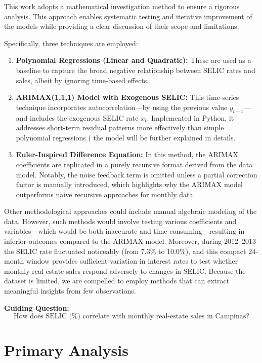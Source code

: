 \documentclass{article}
\begin{document}
This work adopts a mathematical investigation method to ensure a rigorous analysis. This approach enables systematic testing and iterative improvement of the models while providing a clear discussion of their scope and limitations.

Specifically, three techniques are employed:
\begin{enumerate}
    \item \textbf{Polynomial Regressions (Linear and Quadratic):} These are used as a baseline to capture the broad negative relationship between SELIC rates and sales, albeit by ignoring time-based effects.
    \item \textbf{ARIMAX(1,1,1) Model with Exogenous SELIC:} This time-series technique incorporates autocorrelation—by using the previous value \(y_{t-1}\)—and includes the exogenous SELIC rate \(x_t\). Implemented in Python, it addresses short-term residual patterns more effectively than simple polynomial regressions ( the model will be further explained in details.
    \item \textbf{Euler-Inspired Difference Equation:} In this method, the ARIMAX coefficients are replicated in a purely recursive format derived from the data model. Notably, the noise feedback term is omitted unless a partial correction factor is manually introduced, which highlights why the ARIMAX model outperforms naive recursive approaches for monthly data.
\end{enumerate}

Other methodological approaches could include manual algebraic modeling of the data. However, such methods would involve testing various coefficients and variables—which would be both inaccurate and time-consuming—resulting in inferior outcomes compared to the ARIMAX model. Moreover, during 2012–2013 the SELIC rate fluctuated noticeably (from 7.3\% to 10.0\%), and this compact 24-month window provides sufficient variation in interest rates to test whether monthly real-estate sales respond adversely to changes in SELIC. Because the dataset is limited, we are compelled to employ methods that can extract meaningful insights from few observations.

\textbf{Guiding Question:}
\[
\text{How does SELIC (\%) correlate with monthly real-estate sales in Campinas?}
\]

\section{Primary Analysis}
\label{sec:rawdata}
\end{document}
